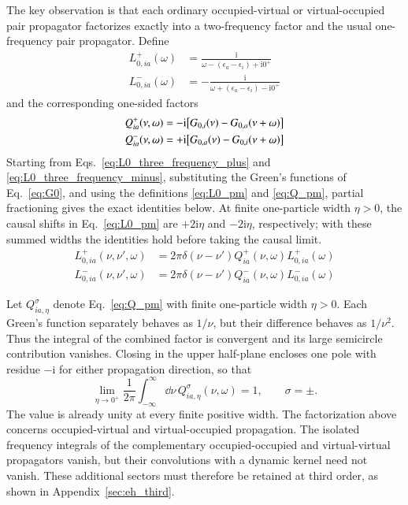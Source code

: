\documentclass[aip,jcp,reprint,noshowkeys,superscriptaddress]{revtex4-1}
\newcommand{\eps}{\epsilon}
\newcommand{\ii}{\mathrm{i}}
\begin{document}
The key observation is that each ordinary occupied-virtual or
virtual-occupied pair propagator factorizes exactly into a two-frequency
factor and the usual one-frequency pair propagator.
Define
\begin{equation}
	\begin{aligned}
	L_{0,ia}^+(\omega)
	&=
	\frac{\ii}
	{\omega-(\eps_a-\eps_i)+\ii0^+}
	\\
	L_{0,ia}^-(\omega)
	&=
	-\frac{\ii}
	{\omega+(\eps_a-\eps_i)-\ii0^+}
	\end{aligned}
	\label{eq:L0_pm}
\end{equation}
and the corresponding one-sided factors
\begin{equation}
	\begin{aligned}
	Q^+_{ia}(\nu,\omega)
	&=
	-\ii
	\qty[
	G_{0,i}(\nu) - G_{0,a}(\nu+\omega)
	]
	\\
	Q^-_{ia}(\nu,\omega)
	&=
	+\ii
	\qty[
	G_{0,a}(\nu) - G_{0,i}(\nu+\omega)
	]
	\end{aligned}
	\label{eq:Q_pm}
\end{equation}
Starting from Eqs.~\eqref{eq:L0_three_frequency_plus} and
\eqref{eq:L0_three_frequency_minus}, substituting the Green's functions of
Eq.~\eqref{eq:G0}, and using the definitions
\eqref{eq:L0_pm} and \eqref{eq:Q_pm}, partial fractioning gives the exact
identities below. At finite one-particle width $\eta>0$, the causal shifts
in Eq.~\eqref{eq:L0_pm} are $+2\ii\eta$ and $-2\ii\eta$, respectively;
with these summed widths the identities hold before taking the causal limit.
\begin{align}
	L_{0,ia}^{+}(\nu,\nu',\omega)
	&=
	2\pi\delta(\nu-\nu')
	Q^+_{ia}(\nu,\omega)
	L_{0,ia}^{+}(\omega)
	\label{eq:L0_factorization_plus}
	\\
	L_{0,ia}^{-}(\nu,\nu',\omega)
	&=
	2\pi\delta(\nu-\nu')
	Q^-_{ia}(\nu,\omega)
	L_{0,ia}^{-}(\omega)
	\label{eq:L0_factorization_minus}
\end{align}


Let $Q^\sigma_{ia,\eta}$ denote Eq.~\eqref{eq:Q_pm} with finite
one-particle width $\eta>0$. Each Green's function separately behaves as
$1/\nu$, but their difference behaves as $1/\nu^2$.
Thus the integral of the combined factor is convergent and its large
semicircle contribution vanishes. Closing in the upper half-plane encloses
one pole with residue $-\ii$ for either propagation direction, so that
\begin{equation}
    \lim_{\eta\to0^+}\frac{1}{2\pi}
    \int_{-\infty}^{\infty}\dd{\nu}\,
    Q^\sigma_{ia,\eta}(\nu,\omega)=1,
    \qquad \sigma=\pm.
    \label{eq:Q_normalization}
\end{equation}
The value is already unity at every finite positive width.
The factorization above concerns occupied-virtual and virtual-occupied
propagation. The isolated frequency integrals of the complementary
occupied-occupied and virtual-virtual propagators vanish, but their
convolutions with a dynamic kernel need not vanish.
These additional sectors must therefore be retained at third order, as
shown in Appendix~\ref{sec:eh_third}.
\end{document}

